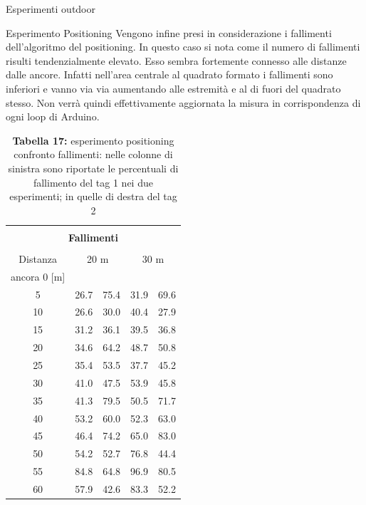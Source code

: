 \documentclass[12pt]{report}
\begin{document}
\begin{section}{Esperimenti outdoor}
\begin{subsection}{Esperimento Positioning}
				Vengono infine presi in considerazione i fallimenti dell'algoritmo del positioning. In questo caso si nota come il numero di fallimenti risulti tendenzialmente elevato. Esso sembra fortemente connesso alle distanze dalle ancore. Infatti nell'area centrale al quadrato formato i fallimenti sono inferiori e vanno via 						via aumentando alle estremità e al di fuori del quadrato stesso. Non verrà quindi effettivamente aggiornata la misura in corrispondenza di ogni loop di Arduino.
				\begin{table}[H]
					\centering
					\begin{tabular}{|c|c|c||c|c|}
						\hline
						\multicolumn{5}{|c|}{}\\
						\multicolumn{5}{|c|}{\textbf{\Large Fallimenti}}\\
						\multicolumn{5}{|c|}{}\\
						\hline
						Distanza&			\multicolumn{2}{|c||}{20 m}&  \multicolumn{2}{|c|}{30 m}\\
						ancora 0 [m]&\multicolumn{2}{|c||}{}&\multicolumn{2}{|c|}{}\\
						\hline
   						5&									26.7&   75.4&   											31.9&   69.6\\
						\hline
   						10&									26.6&   30.0&   											40.4&   27.9\\
						\hline
   						15&									31.2&   36.1&  											39.5&   36.8\\
						\hline
   						20&									34.6&   64.2&   											48.7&   50.8\\
						\hline
   						25&									35.4&   53.5&   											37.7&   45.2\\
						\hline
   						30&									41.0&   47.5&   											53.9&   45.8\\
						\hline
   						35&									41.3&   79.5&   											50.5&   71.7\\
						\hline
   						40&									53.2&   60.0&   											52.3&   63.0\\
						\hline
   						45&									46.4&   74.2&   											65.0&   83.0\\
						\hline
   						50&									54.2&   52.7&   											76.8&   44.4\\
						\hline
   						55&									84.8&   64.8&   											96.9&   80.5\\
						\hline
   						60&									57.9&   42.6&   											83.3&   52.2\\
						\hline
					\end{tabular}
				\caption{\textbf{Tabella 17:} esperimento positioning confronto fallimenti: nelle colonne di sinistra sono riportate le percentuali di fallimento del tag 1 nei due esperimenti; in quelle di destra del tag 2\label{EspOutFall}}
			\end{table}


\end{subsection}
\end{section}
\end{document}
